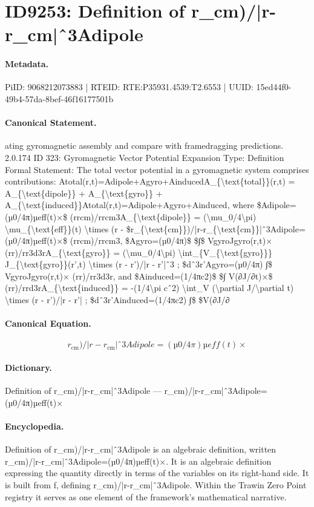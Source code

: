 \section*{ID9253: Definition of r\_cm)/|r-r\_cm|ˆ3Adipole}
\paragraph{Metadata.}
PiID: 9068212073883 | RTEID: RTE:P35931.4539:T2.6553 | UUID: 15ed44f0-49b4-57da-8bef-46f16177501b

\paragraph{Canonical Statement.}
ating gyromagnetic assembly and compare with framedragging predictions. 2.0.174 ID 323: Gyromagnetic Vector Potential Expansion Type: Definition Formal Statement: The total vector potential in a gyromagnetic system comprises contributions: Atotal(r,t)=Adipole+Agyro+AinducedA\_\{\textbackslash{}text\{total\}\}(r,t) = A\_\{\textbackslash{}text\{dipole\}\} + A\_\{\textbackslash{}text\{gyro\}\} + A\_\{\textbackslash{}text\{induced\}\}Atotal(r,t)=Adipole+Agyro+Ainduced, where \$Adipole=(µ0/4π)µeff(t)×\$ (rrcm)/rrcm3A\_\{\textbackslash{}text\{dipole\}\} = (\textbackslash{}mu\_0/4\textbackslash{}pi) \textbackslash{}mu\_\{\textbackslash{}text\{eff\}\}(t) \textbackslash{}times (r - \$r\_\{\textbackslash{}text\{cm\}\})/|r-r\_\{\textbackslash{}text\{cm\}\}|ˆ3Adipole=(µ0/4π)µeff(t)×\$ (rrcm)/rrcm3, \$Agyro=(µ0/4π)\$ \$∫\$ VgyroJgyro(r,t)× (rr)/rr3d3rA\_\{\textbackslash{}text\{gyro\}\} = (\textbackslash{}mu\_0/4\textbackslash{}pi) \textbackslash{}int\_\{V\_\{\textbackslash{}text\{gyro\}\}\} J\_\{\textbackslash{}text\{gyro\}\}(r’,t) \textbackslash{}times (r - r’)/|r - r’|ˆ3 ; \$dˆ3r’Agyro=(µ0/4π) ∫\$ VgyroJgyro(r,t)× (rr)/rr3d3r, and \$Ainduced=(1/4πc2)\$ \$∫ V(∂J/∂t)×\$ (rr)/rrd3rA\_\{\textbackslash{}text\{induced\}\} = -(1/4\textbackslash{}pi cˆ2) \textbackslash{}int\_V (\textbackslash{}partial J/\textbackslash{}partial t) \textbackslash{}times (r - r’)/|r - r’| ; \$dˆ3r’Ainduced=(1/4πc2) ∫\$ \$V(∂J/∂

\paragraph{Canonical Equation.}
\[
r_{\text{cm}})/|r-r_{\text{cm}}|ˆ3Adipole=(µ0/4π)µeff(t)×
\]

\paragraph{Dictionary.}
Definition of r\_cm)/|r-r\_cm|ˆ3Adipole — r\_cm)/|r-r\_cm|ˆ3Adipole=(µ0/4π)µeff(t)×

\paragraph{Encyclopedia.}
Definition of r\_cm)/|r-r\_cm|ˆ3Adipole is an algebraic definition, written r\_cm)/|r-r\_cm|ˆ3Adipole=(µ0/4π)µeff(t)×. It is an algebraic definition expressing the quantity directly in terms of the variables on its right-hand side. It is built from f, defining r\_cm)/|r-r\_cm|ˆ3Adipole. Within the Trawin Zero Point registry it serves as one element of the framework's mathematical narrative.
